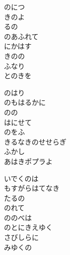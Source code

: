 \documentclass[10pt,b5j]{tarticle} %
\begin{document}
\vspace{1.5em} %
\newcommand{\linespace}{0.5em} %
\newcommand{\blocksize}{0.5\hsize} %
\begin{enumerate} %
    \begin{minipage}[c]{\blocksize}
    
        \vspace{\linespace}
        \item
        のにつ\\
        きのよ\\
        るの\\
        のあふれて\\
        にかはす\\
        きのの\\
        ふなり\\
        とのきを
        
        \vspace{\linespace}
        \item
        のはり\\
        のもはるかに\\
        のの\\
        はにせて\\
        のをふ\\
        きるなきのせせらぎ\\
        ふかし\\
        あはきポプラよ
        
        \vspace{\linespace}
        \item
        いでくのは\\
        もすがらはてなき\\
        たるの\\
        のれて\\
        ののべは\\
        のとにきえゆく\\
        さびしらに\\
        みゆくの
        

\end{minipage}
\end{enumerate}
\end{document}
